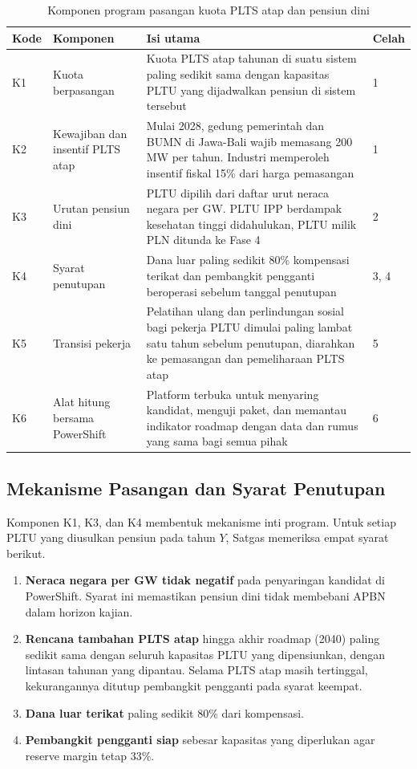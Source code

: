 \begin{table}[H]
\centering
\caption{Komponen program pasangan kuota PLTS atap dan pensiun dini}
\label{tab:komponen}
\small
\begin{tabularx}{\textwidth}{L{0.7cm} L{3.3cm} Y L{1.9cm}}
\toprule
Kode & Komponen & Isi utama & Celah \\
\midrule
K1 & Kuota berpasangan & Kuota PLTS atap tahunan di suatu sistem paling sedikit sama dengan kapasitas PLTU yang dijadwalkan pensiun di sistem tersebut & 1 \\
\addlinespace
K2 & Kewajiban dan insentif PLTS atap & Mulai 2028, gedung pemerintah dan BUMN di Jawa-Bali wajib memasang 200 MW per tahun. Industri memperoleh insentif fiskal 15\% dari harga pemasangan & 1 \\
\addlinespace
K3 & Urutan pensiun dini & PLTU dipilih dari daftar urut neraca negara per GW. PLTU IPP berdampak kesehatan tinggi didahulukan, PLTU milik PLN ditunda ke Fase 4 & 2 \\
\addlinespace
K4 & Syarat penutupan & Dana luar paling sedikit 80\% kompensasi terikat dan pembangkit pengganti beroperasi sebelum tanggal penutupan & 3, 4 \\
\addlinespace
K5 & Transisi pekerja & Pelatihan ulang dan perlindungan sosial bagi pekerja PLTU dimulai paling lambat satu tahun sebelum penutupan, diarahkan ke pemasangan dan pemeliharaan PLTS atap & 5 \\
\addlinespace
K6 & Alat hitung bersama PowerShift & Platform terbuka untuk menyaring kandidat, menguji paket, dan memantau indikator roadmap dengan data dan rumus yang sama bagi semua pihak & 6 \\
\bottomrule
\end{tabularx}
\end{table}

\subsection{Mekanisme Pasangan dan Syarat Penutupan}

Komponen K1, K3, dan K4 membentuk mekanisme inti program. Untuk setiap PLTU yang diusulkan pensiun pada tahun $Y$, Satgas memeriksa empat syarat berikut.
\begin{enumerate}
  \item \textbf{Neraca negara per GW tidak negatif} pada penyaringan kandidat di PowerShift. Syarat ini memastikan pensiun dini tidak membebani APBN dalam horizon kajian.
  \item \textbf{Rencana tambahan PLTS atap} hingga akhir roadmap (2040) paling sedikit sama dengan seluruh kapasitas PLTU yang dipensiunkan, dengan lintasan tahunan yang dipantau. Selama PLTS atap masih tertinggal, kekurangannya ditutup pembangkit pengganti pada syarat keempat.
  \item \textbf{Dana luar terikat} paling sedikit 80\% dari kompensasi.
  \item \textbf{Pembangkit pengganti siap} sebesar kapasitas yang diperlukan agar reserve margin tetap 33\%.
\end{enumerate}

